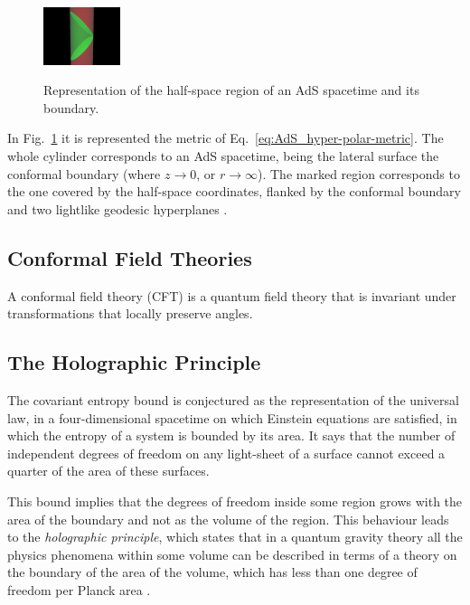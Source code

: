 \documentclass[twocolumn]{revtex4}
\begin{document}
\begin{figure}
    \centering
    \includegraphics[width=0.2\textwidth]{../Imatges/Extern/Wikipedia_Half-space_Cilindric.png}
\label{fig:AdS_cylindrical}
\caption{Representation of the half-space region of an AdS spacetime and its boundary.}
\end{figure}

In Fig.~\ref{fig:AdS_cylindrical} it is represented the metric of Eq.~\ref{eq:AdS_hyper-polar-metric}. The whole cylinder corresponds to an AdS spacetime, being the lateral surface the conformal boundary (where $z \to 0$, or $r \to \infty$). The marked region corresponds to the one covered by the half-space coordinates, flanked by the conformal boundary and two lightlike geodesic hyperplanes \cite{}.


\subsection{Conformal Field Theories} \label{ss:CFT}

A conformal field theory (CFT) is a quantum field theory that is invariant under transformations that locally preserve angles.


\subsection{The Holographic Principle} \label{ss:Holography}

The covariant entropy bound \cite{bousso_covariant_1999} is conjectured as the representation of the universal law, in a four-dimensional spacetime on which Einstein equations are satisfied, in which the entropy of a system is bounded by its area. It says that the number of independent degrees of freedom on any light-sheet of a surface cannot exceed a quarter of the area of these surfaces.

This bound implies that the degrees of freedom inside some region grows with the area of the boundary and not as the volume of the region. This behaviour leads to the \textit{holographic principle}, which states that in a quantum gravity theory all the physics phenomena within some volume can be described in terms of a theory on the boundary of the area of the volume, which has less than one degree of freedom per Planck area \cite{t_hooft_dimensional_2009}.
\end{document}
